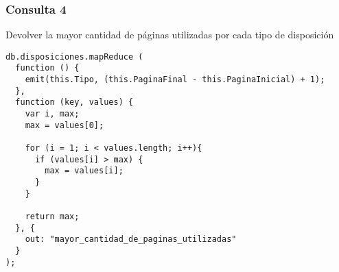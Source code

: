 \subsubsection{Consulta 4}
Devolver la mayor cantidad de p\'aginas utilizadas por cada tipo de disposici\'on

\begin{lstlisting}
db.disposiciones.mapReduce (
  function () {
    emit(this.Tipo, (this.PaginaFinal - this.PaginaInicial) + 1);
  },
  function (key, values) {
    var i, max;
    max = values[0];

    for (i = 1; i < values.length; i++){
      if (values[i] > max) {
        max = values[i];
      }
    }

    return max;
  }, {
    out: "mayor_cantidad_de_paginas_utilizadas"
  }
);
\end{lstlisting}